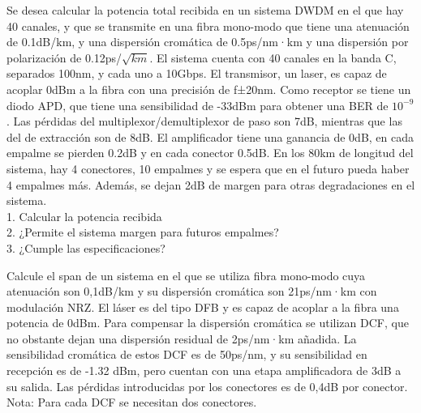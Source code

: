 \begin{exercise}[9]
	Se desea calcular la potencia total recibida en un sistema DWDM en el que hay 40 canales, y que se transmite en una fibra mono-modo que tiene una atenuación de 0.1dB/km, y una dispersión cromática de 0.5ps/nm·km y una dispersión por polarización de 0.12ps/$\sqrt{km}$. El sistema cuenta con 40 canales en la banda C, separados 100nm, y cada uno a 10Gbps. El transmisor, un laser, es capaz de acoplar 0dBm a la fibra con una precisión de f±20nm. Como receptor se tiene un diodo APD, que tiene una sensibilidad de -33dBm para obtener una BER de $10^{-9}$ . Las pérdidas del multiplexor/demultiplexor de paso son 7dB, mientras que las del de extracción son de 8dB. El amplificador tiene una ganancia de 0dB, en cada empalme se pierden 0.2dB y en cada conector 0.5dB. En los 80km de longitud del sistema, hay 4 conectores, 10 empalmes y se espera que en el futuro pueda haber 4 empalmes más. Además, se dejan 2dB de margen para otras degradaciones en el sistema.\\
1. Calcular la potencia recibida\\
2. ¿Permite el sistema margen para futuros empalmes?\\
3. ¿Cumple las especificaciones?
\end{exercise}
\begin{exercise}[10]
	Calcule el span de un sistema en el que se utiliza fibra mono-modo cuya atenuación son 0,1dB/km y su dispersión cromática son 21ps/nm·km con modulación NRZ. El láser es del tipo DFB y es capaz de acoplar a la fibra una potencia de 0dBm. Para compensar la dispersión cromática se utilizan DCF, que no obstante dejan una dispersión residual de 2ps/nm·km añadida. La sensibilidad cromática de estos DCF es de 50ps/nm, y su sensibilidad en recepción es de -1.32 dBm, pero cuentan con una etapa amplificadora de 3dB a su salida. Las pérdidas introducidas por los conectores es de 0,4dB por conector.\\
Nota: Para cada DCF se necesitan dos conectores.
\end{exercise}